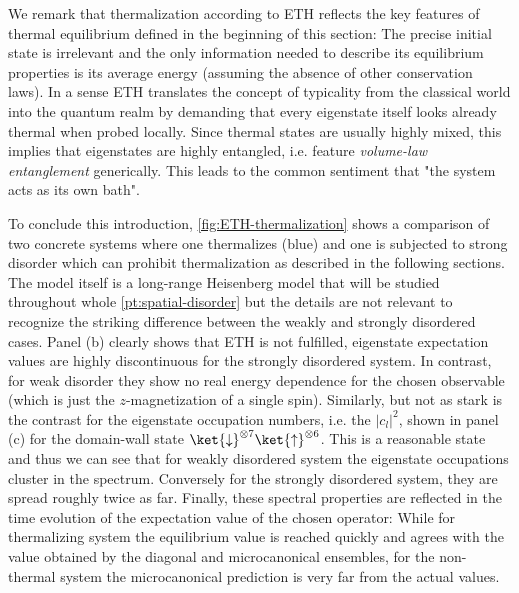 We remark that thermalization according to ETH reflects the key features of thermal equilibrium defined in the beginning of this section: The precise initial state is irrelevant and the only information needed to describe its equilibrium properties is its average energy (assuming the absence of other conservation laws). In a sense ETH translates the concept of typicality from the classical world into the quantum realm by demanding that every eigenstate itself looks already thermal when probed locally. Since thermal states are usually highly mixed, this implies that eigenstates are highly entangled, i.e. feature \emph{volume-law entanglement} generically. This leads to the common sentiment that "the system acts as its own bath".

To conclude this introduction, \autoref{fig:ETH-thermalization} shows a comparison of two concrete systems where one thermalizes (blue) and one is subjected to strong disorder which can prohibit thermalization as described in the following sections. The model itself is a long-range Heisenberg model that will be studied throughout whole \autoref{pt:spatial-disorder} but the details are not relevant to recognize the striking difference between the weakly and strongly disordered cases. Panel (b) clearly shows that ETH is not fulfilled, eigenstate expectation values are highly discontinuous for the strongly disordered system. In contrast, for weak disorder they show no real energy dependence for the chosen observable (which is just the $z$-magnetization of a single spin). Similarly, but not as stark is the contrast for the eigenstate occupation numbers, i.e. the $|c_l|^2$, shown in panel (c) for the domain-wall state $\ket{\downarrow}^{\otimes 7}\ket{\uparrow}^{\otimes 6}$. This is a reasonable state and thus we can see that for weakly disordered system the eigenstate occupations cluster in the spectrum. Conversely for the strongly disordered system, they are spread roughly twice as far. Finally, these spectral properties are reflected in the time evolution of the expectation value of the chosen operator: While for thermalizing system the equilibrium value is reached quickly and agrees with the value obtained by the diagonal and microcanonical ensembles, for the non-thermal system the microcanonical prediction is very far from the actual values.


